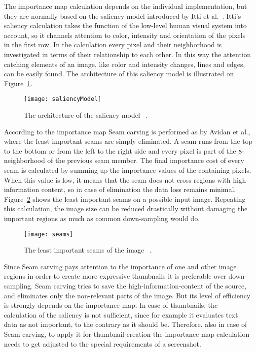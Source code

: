 \documentclass[draft,final]{vutinfth} %
\begin{document}
	The importance map calculation depends on the individual implementation, but they are normally based on the saliency model introduced by Itti et al.~\cite{itti1998model}.
	Itti's saliency calculation takes the function of the low-level human visual system into account, so it channels attention to color, intensity and orientation of the pixels in the first row.
	In the calculation every pixel and their neighborhood is investigated in terms of their relationship to each other.
	In this way the attention catching elements of an image, like color and intensity changes, lines and edges, can be easily found. 
	The architecture of this saliency model is illustrated on Figure~\ref{fig:salMod}.\par 
	\begin{figure}[H]
		\centering		
		\texttt{[image: saliencyModel]}
		\caption{The architecture of the saliency model ~\cite{itti1998model}.}
		\label{fig:salMod}
	\end{figure}
	According to the importance map Seam carving is performed as by Avidan et al.\cite{avidan2007seam}, where the least important seams are simply eliminated.
	A seam runs from the top to the bottom or from the left to the right side and every pixel is part of the 8-neighborhood of the previous seam member.
	The final importance cost of every seam is calculated by summing up the importance values of the containing pixels.
	When this value is low, it means that the seam does not cross regions with high information content, so in case of elimination the data loss remains minimal.
	Figure~\ref{fig:seamsDol} shows the least important seams on a possible input image.
	Repeating this calculation, the image size can be reduced drastically without damaging the important regions as much as common down-sampling would do.\par 
	\begin{figure}[H]
		\centering		
		\texttt{[image: seams]}
		\caption{The least important seams of the image ~\cite{avidan2007seam}.}
		\label{fig:seamsDol}
	\end{figure} 
	Since Seam carving pays attention to the importance of one and other image regions in order to create more expressive thumbnails it is preferable over down-sampling.
	Seam carving tries to save the high-information-content of the source, and eliminates only the non-relevant parts of the image.
	But its level of efficiency is strongly depends on the importance map.
	In case of thumbnails, the calculation of the saliency is not sufficient, since for example it evaluates text data as not important, to the contrary as it should be.
	Therefore, also in case of Seam carving, to apply it for thumbnail creation the importance map calculation needs to get adjusted to the special requirements of a screenshot. 
	
\end{document}
